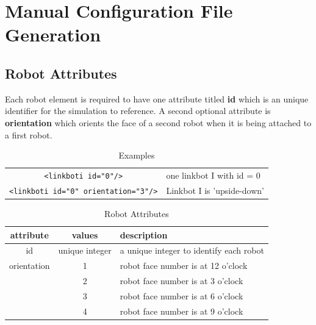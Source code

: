 \documentclass{article}
\begin{document}
\appendix
\section{Manual Configuration File Generation}
\subsection{Robot Attributes}
Each robot element is required to have one attribute titled \textbf{id} which is
an unique identifier for the simulation to reference.  A second optional
attribute is \textbf{orientation} which orients the face of a second robot when
it is being attached to a first robot.

\begin{table}[H]
	\begin{center}
	\begin{tabular}{c | l}
		\hline 
		\verb|<linkboti id="0"/>| & one linkbot I with id = 0 \\
		\verb|<linkboti id="0" orientation="3"/>| & Linkbot I is 'upside-down' \\
		\hline
	\end{tabular}
	\caption{Examples}
	\label{tab:ex}
	\end{center}
\end{table}

\begin{table}[H]
	\begin{center}
	\begin{tabular}{c | c | l}
		\hline \hline
		\textbf{attribute} & \textbf{values} & \textbf{description} \\ \hline
		id & unique integer & a unique integer to identify each robot \\
		orientation & 1 & robot face number is at 12 o'clock \\
		 & 2 & robot face number is at 3 o'clock \\
		 & 3 & robot face number is at 6 o'clock \\
		 & 4 & robot face number is at 9 o'clock \\
		\hline \hline
	\end{tabular}
	\caption{Robot Attributes}
	\label{tab:attributes}
	\end{center}
\end{table}
\end{document}
